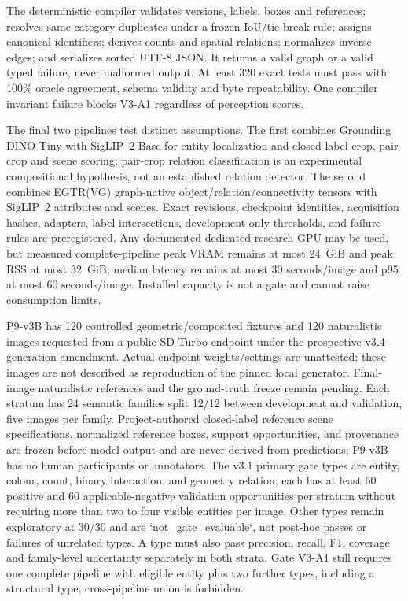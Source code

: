 \documentclass[compsoc,conference,a4paper,10pt,times]{IEEEtran}
\begin{document}
The deterministic compiler validates versions, labels, boxes and references; resolves same-category duplicates under a frozen IoU/tie-break rule; assigns canonical identifiers; derives counts and spatial relations; normalizes inverse edges; and serializes sorted UTF-8 JSON. It returns a valid graph or a valid typed failure, never malformed output. At least 320 exact tests must pass with 100\% oracle agreement, schema validity and byte repeatability. One compiler invariant failure blocks V3-A1 regardless of perception scores.

The final two pipelines test distinct assumptions. The first combines Grounding DINO Tiny with SigLIP~2 Base for entity localization and closed-label crop, pair-crop and scene scoring; pair-crop relation classification is an experimental compositional hypothesis, not an established relation detector. The second combines EGTR(VG) graph-native object/relation/connectivity tensors with SigLIP~2 attributes and scenes. Exact revisions, checkpoint identities, acquisition hashes, adapters, label intersections, development-only thresholds, and failure rules are preregistered. Any documented dedicated research GPU may be used, but measured complete-pipeline peak VRAM remains at most 24~GiB and peak RSS at most 32~GiB; median latency remains at most 30 seconds/image and p95 at most 60 seconds/image. Installed capacity is not a gate and cannot raise consumption limits.

P9-v3B has 120 controlled geometric/composited fixtures and 120 naturalistic images requested from a public SD-Turbo endpoint under the prospective v3.4 generation amendment. Actual endpoint weights/settings are unattested; these images are not described as reproduction of the pinned local generator. Final-image naturalistic references and the ground-truth freeze remain pending. Each stratum has 24 semantic families split 12/12 between development and validation, five images per family. Project-authored closed-label reference scene specifications, normalized reference boxes, support opportunities, and provenance are frozen before model output and are never derived from predictions; P9-v3B has no human participants or annotators. The v3.1 primary gate types are entity, colour, count, binary interaction, and geometry relation; each has at least 60 positive and 60 applicable-negative validation opportunities per stratum without requiring more than two to four visible entities per image. Other types remain exploratory at 30/30 and are `not\_gate\_evaluable`, not post-hoc passes or failures of unrelated types. A type must also pass precision, recall, F1, coverage and family-level uncertainty separately in both strata. Gate V3-A1 still requires one complete pipeline with eligible entity plus two further types, including a structural type; cross-pipeline union is forbidden.
\end{document}
